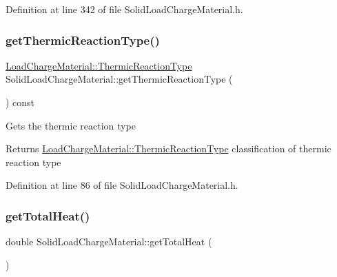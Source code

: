 Definition at line 342 of file Solid\+Load\+Charge\+Material.\+h.

\mbox{\label{class_solid_load_charge_material_a11708312a99ab985d980e1e521e0864c}} 
\subsubsection{\texorpdfstring{get\+Thermic\+Reaction\+Type()}{getThermicReactionType()}}
{\footnotesize\ttfamily \hyperlink{namespace_load_charge_material_a51d4263e865a5d86236622dd3fe23fd1}{Load\+Charge\+Material\+::\+Thermic\+Reaction\+Type} Solid\+Load\+Charge\+Material\+::get\+Thermic\+Reaction\+Type (\begin{DoxyParamCaption}{ }\end{DoxyParamCaption}) const\hspace{0.3cm}{\ttfamily [inline]}}

Gets the thermic reaction type \begin{DoxyReturn}{Returns}
\hyperlink{namespace_load_charge_material_a51d4263e865a5d86236622dd3fe23fd1}{Load\+Charge\+Material\+::\+Thermic\+Reaction\+Type} classification of thermic reaction type 
\end{DoxyReturn}


Definition at line 86 of file Solid\+Load\+Charge\+Material.\+h.

\mbox{\label{class_solid_load_charge_material_af8593eb758c64236a8a026d6145584f4}} 
\subsubsection{\texorpdfstring{get\+Total\+Heat()}{getTotalHeat()}}
{\footnotesize\ttfamily double Solid\+Load\+Charge\+Material\+::get\+Total\+Heat (\begin{DoxyParamCaption}{ }\end{DoxyParamCaption})\hspace{0.3cm}{\ttfamily [inline]}}

